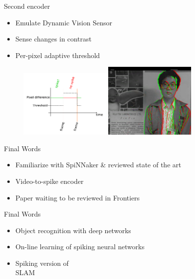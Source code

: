 \documentclass[17pt,mathserif]{beamer}
\begin{document}
    \begin{frame}{Second encoder}
      \vspace*{-2em}
      \begin{itemize}
        \item Emulate Dynamic Vision Sensor 
        \item Sense changes in contrast
        \item Per-pixel adaptive threshold
      \end{itemize}
      \vspace*{-1em}
      \begin{figure}
        \includegraphics[width=0.4\textwidth]{DVSemu} 
        \hspace*{0.1em}
        \includegraphics[width=0.4\textwidth]{dvs-emu-img}
      \end{figure}
    \end{frame}

    \begin{frame}{Final Words}
        \vspace*{-3em}
        \begin{itemize}
          \item[$\checkmark$] Familiarize with SpiNNaker \& reviewed state of the art
          \item[$\checkmark$] Video-to-spike encoder
          \item[$\checkmark$] Paper waiting to be reviewed in Frontiers
        \end{itemize}
    \end{frame}

    \begin{frame}{Final Words}
      \vspace*{-3em}
      \begin{itemize}
        \item[{\footnotesize [\textsc{to do}]}] Object recognition with deep networks
        \item[{\footnotesize [\textsc{to do}]}] On-line learning of spiking neural networks
        \item[{\footnotesize [\textsc{to do}]}] Spiking version of \\SLAM
      \end{itemize}
    \end{frame}
\end{document}
